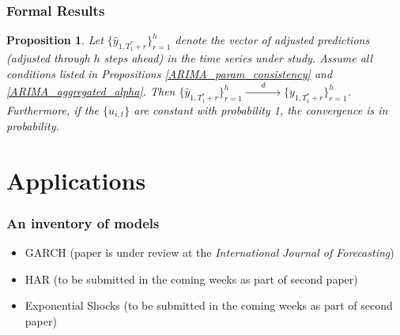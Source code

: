\documentclass[9pt]{beamer}
\newtheorem{prop}{Proposition}
\theoremstyle{definition}
\begin{document}
\begin{frame}\frametitle{Formal Results}
        
        \begin{prop}\label{ARIMA_conv_distribution}
          Let $\{\hat y_{1,T_{1}^{*}+r}\}^{h}_{r=1}$ denote the vector of adjusted predictions (adjusted through $h$ steps ahead) in the time series under study.  Assume all conditions listed in Propositions \ref{ARIMA_param_consistency} and \ref{ARIMA_aggregated_alpha}.  Then $\{\hat y_{1,T_{1}^{*}+r}\}^{h}_{r=1} \xrightarrow{\qquad d\qquad} \{ y_{1,T_{1}^{*}+r}\}^{h}_{r=1}$.  Furthermore, if the $\{u_{i,t}\}$ are constant with probability 1, the convergence is in probability. 
          \end{prop}
\end{frame}

\section{Applications}

\begin{frame}
    \frametitle{An inventory of models}

    \begin{itemize}
        \item <1-> GARCH (paper is under review at the \textit{International Journal of Forecasting})
        \item <2-> HAR (to be submitted in the coming weeks as part of second paper)
        \item <3-> Exponential Shocks (to be submitted in the coming weeks as part of second paper)

    \end{itemize}
\end{frame}



\end{document}
